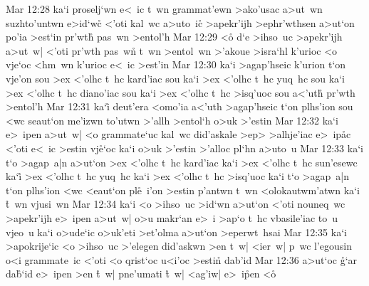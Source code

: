 \vs Mar 12:28
ka`i
proselj`wn
e<~ic
t~wn
grammat'ewn
>ako'usac
a>ut~wn
suzhto'untwn
e>id`w\r{c}
<'oti
kal~wc
a>uto~ic\r{}
>apekr'ijh
>ephr'wthsen
a>ut`on
po'ia
>est`in
pr'wth\r{}
pas~wn
>entol'h\bibvsend
\vs Mar 12:29
<o\r{}
d`e
>ihso~uc
>apekr'ijh
a>ut~w|
<'oti
pr'wth
pas~wn\r{}
t~wn
>entol~wn
>'akoue
>isra`hl
k'urioc
<o
vje`oc
<hm~wn
k'urioc
e<~ic
>est'in\bibvsend
\vs Mar 12:30
ka`i
>agap'hseic
k'urion
t`on
vje'on
sou
>ex
<'olhc
t~hc
kard'iac
sou
ka`i
>ex
<'olhc
t~hc
yuq~hc
sou
ka`i
>ex
<'olhc
t~hc
diano'iac
sou
ka`i
>ex
<'olhc
t~hc
>isq'uoc
sou
a<'uth\r{}
pr'wth
>entol'h\bibvsend
\vs Mar 12:31
ka`i\r{}
deut'era
<omo'ia
a<'uth
>agap'hseic
t`on
plhs'ion
sou
<wc
seaut`on
me'izwn
to'utwn
>'allh
>entol`h
o>uk
>'estin\bibvsend
\vs Mar 12:32
ka`i
e>~ipen
a>ut~w|
<o
grammate`uc
kal~wc
did'askale
>ep>
>alhje'iac
e>~ip\r{a}c
<'oti
e<~ic
>estin
vj\r{e}`oc
ka`i
o>uk
>'estin
>'alloc
pl`hn
a>uto~u\bibvsend
\vs Mar 12:33
ka`i
t`o
>agap~a|n
a>ut`on
>ex
<'olhc
t~hc
kard'iac
ka`i
>ex
<'olhc
t~hc
sun'esewc
ka`i\r{}
>ex
<'olhc
t~hc
yuq~hc
ka`i
>ex
<'olhc
t~hc
>isq'uoc
ka`i
t`o
>agap~a|n
t`on
plhs'ion
<wc
<eaut`on
pl\r{e}~i'on
>estin
p'antwn
t~wn
<olokautwm'atwn
ka`i
\r{t}~wn
vjusi~wn\bibvsend
\vs Mar 12:34
ka`i
<o
>ihso~uc
>id`wn
a>ut`on
<'oti
nouneq~wc
>apekr'ijh
e>~ipen
a>ut~w|
o>u
makr`an
e>~i
>ap`o
t~hc
vbasile'iac
to~u
vjeo~u
ka`i
o>ude`ic
o>uk'eti
>et'olma
a>ut`on
>eperwt~hsai\bibvsend
\vs Mar 12:35
ka`i
>apokrije`ic
<o
>ihso~uc
>'elegen
did'askwn
>en
t~w|
<ier~w|
p~wc
l'egousin
o<i
grammate~ic
<'oti
<o
qrist`oc
u<i'oc
>estin\r{}
dab'id\bibvsend
\vs Mar 12:36
a>ut`oc
\r{g}`ar
da\r{b}`id
e>~ipen
>en
\r{t}~w|
pne'umati
\r{t}~w|
<ag'iw|
e>~i\r{p}en
<o\r{}
